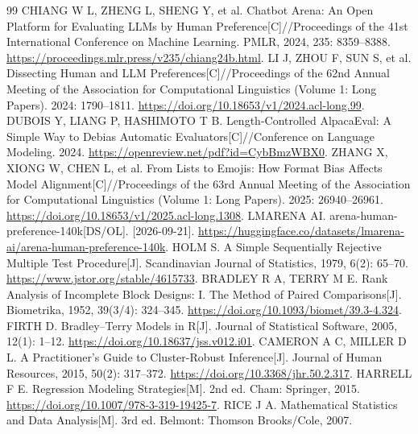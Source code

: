 \documentclass[UTF8,11pt,a4paper,fontset=windows]{ctexart}
\numberwithin{equation}{section}
\begin{document}
\FloatBarrier
\begin{thebibliography}{99}\small
{} CHIANG W L, ZHENG L, SHENG Y, et al. Chatbot Arena: An Open Platform for Evaluating LLMs by Human Preference[C]//Proceedings of the 41st International Conference on Machine Learning. PMLR, 2024, 235: 8359--8388. \url{https://proceedings.mlr.press/v235/chiang24b.html}.
 LI J, ZHOU F, SUN S, et al. Dissecting Human and LLM Preferences[C]//Proceedings of the 62nd Annual Meeting of the Association for Computational Linguistics (Volume 1: Long Papers). 2024: 1790--1811. \url{https://doi.org/10.18653/v1/2024.acl-long.99}.
 DUBOIS Y, LIANG P, HASHIMOTO T B. Length-Controlled AlpacaEval: A Simple Way to Debias Automatic Evaluators[C]//Conference on Language Modeling. 2024. \url{https://openreview.net/pdf?id=CybBmzWBX0}.
 ZHANG X, XIONG W, CHEN L, et al. From Lists to Emojis: How Format Bias Affects Model Alignment[C]//Proceedings of the 63rd Annual Meeting of the Association for Computational Linguistics (Volume 1: Long Papers). 2025: 26940--26961. \url{https://doi.org/10.18653/v1/2025.acl-long.1308}.
 LMARENA AI. arena-human-preference-140k[DS/OL]. [2026-09-21]. \url{https://huggingface.co/datasets/lmarena-ai/arena-human-preference-140k}.
 HOLM S. A Simple Sequentially Rejective Multiple Test Procedure[J]. Scandinavian Journal of Statistics, 1979, 6(2): 65--70. \url{https://www.jstor.org/stable/4615733}.
 BRADLEY R A, TERRY M E. Rank Analysis of Incomplete Block Designs: I. The Method of Paired Comparisons[J]. Biometrika, 1952, 39(3/4): 324--345. \url{https://doi.org/10.1093/biomet/39.3-4.324}.
 FIRTH D. Bradley--Terry Models in R[J]. Journal of Statistical Software, 2005, 12(1): 1--12. \url{https://doi.org/10.18637/jss.v012.i01}.
 CAMERON A C, MILLER D L. A Practitioner's Guide to Cluster-Robust Inference[J]. Journal of Human Resources, 2015, 50(2): 317--372. \url{https://doi.org/10.3368/jhr.50.2.317}.
 HARRELL F E. Regression Modeling Strategies[M]. 2nd ed. Cham: Springer, 2015. \url{https://doi.org/10.1007/978-3-319-19425-7}.
 RICE J A. Mathematical Statistics and Data Analysis[M]. 3rd ed. Belmont: Thomson Brooks/Cole, 2007.
\end{thebibliography}
\end{document}
